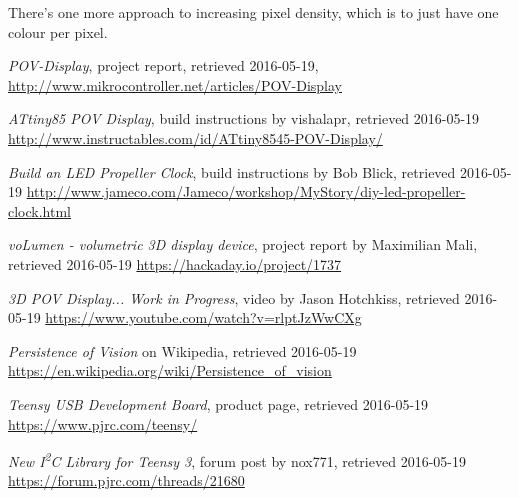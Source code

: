 \documentclass[a4paper, 11pt, titlepage]{report}
\def \itwoc {I\textsuperscript{2}C\xspace}
\begin{document}
There's one more approach to increasing pixel density, which is to just have one colour per
pixel.


















\begin{thebibliography}{99}

\emph{POV-Display}, project report, retrieved 2016-05-19,
\newline \url{http://www.mikrocontroller.net/articles/POV-Display}

\emph{ATtiny85 POV Display}, build instructions by vishalapr, retrieved 2016-05-19
\newline \url{http://www.instructables.com/id/ATtiny8545-POV-Display/}

\emph{Build an LED Propeller Clock}, build instructions by Bob Blick, retrieved 2016-05-19
\newline \url{http://www.jameco.com/Jameco/workshop/MyStory/diy-led-propeller-clock.html}

\emph{voLumen - volumetric 3D display device}, project report by Maximilian Mali, 
retrieved 2016-05-19
\newline \url{https://hackaday.io/project/1737}

\emph{3D POV Display... Work in Progress}, video by Jason Hotchkiss, retrieved 2016-05-19
\newline \url{https://www.youtube.com/watch?v=rlptJzWwCXg}

\emph{Persistence of Vision} on Wikipedia, retrieved 2016-05-19
\newline \url{https://en.wikipedia.org/wiki/Persistence\_of\_vision}


\emph{Teensy USB Development Board}, product page, retrieved 2016-05-19
\newline \url{https://www.pjrc.com/teensy/}

\emph{New \itwoc Library for Teensy 3}, forum post by nox771, retrieved 2016-05-19
\newline \url{https://forum.pjrc.com/threads/21680}


\end{thebibliography}
\end{document}

